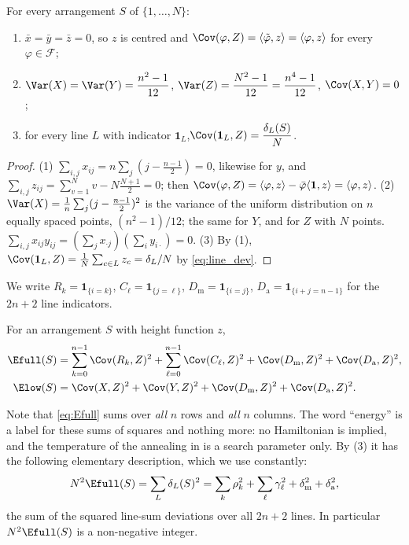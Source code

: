 \begin{lemma}
\label{lem:variances}
For every arrangement $S$ of $\{1,\dots,N\}$:
\begin{enumerate}
\item $\bar x=\bar y=\bar z=0$, so $z$ is centred and $\Cov(\varphi,Z)=\langle\tilde\varphi,z\rangle=\langle\varphi,z\rangle$ for every $\varphi\in\mathcal F$;
\item $\Var(X)=\Var(Y)=\dfrac{n^{2}-1}{12}$, \quad $\Var(Z)=\dfrac{N^{2}-1}{12}=\dfrac{n^{4}-1}{12}$, \quad $\Cov(X,Y)=0$;
\item for every line $L$ with indicator $\mathbf 1_L$,\quad $\Cov(\mathbf 1_L,Z)=\dfrac{\delta_L(S)}{N}$.
\end{enumerate}
\end{lemma}

\begin{proof}
(1) $\sum_{i,j}x_{ij}=n\sum_{j}(j-\frac{n-1}2)=0$, likewise for $y$, and $\sum_{i,j}z_{ij}=\sum_{v=1}^{N}v-N\frac{N+1}2=0$;
then $\Cov(\varphi,Z)=\langle\varphi,z\rangle-\bar\varphi\langle\mathbf 1,z\rangle=\langle\varphi,z\rangle$.
(2) $\Var(X)=\frac1n\sum_{j}(j-\frac{n-1}2)^{2}$ is the variance of the uniform distribution on $n$ equally spaced
points, $(n^{2}-1)/12$; the same for $Y$, and for $Z$ with $N$ points.  $\sum_{i,j}x_{ij}y_{ij}=(\sum_jx_{\cdot j})(\sum_iy_{i\cdot})=0$.
(3) By (1), $\Cov(\mathbf 1_L,Z)=\frac1N\sum_{c\in L}z_c=\delta_L/N$ by \eqref{eq:line_dev}.
\end{proof}

We write $R_k=\mathbf 1_{\{i=k\}}$, $C_\ell=\mathbf 1_{\{j=\ell\}}$,
$D_{\mathrm{m}}=\mathbf 1_{\{i=j\}}$, $D_{\mathrm{a}}=\mathbf 1_{\{i+j=n-1\}}$ for the $2n+2$ line indicators.

\begin{definition}
\label{def:energies}
For an arrangement $S$ with height function $z$,
\begin{align}
\Efull(S)&=\sum_{k=0}^{n-1}\Cov(R_k,Z)^{2}+\sum_{\ell=0}^{n-1}\Cov(C_\ell,Z)^{2}
+\Cov(D_{\mathrm m},Z)^{2}+\Cov(D_{\mathrm a},Z)^{2},\label{eq:Efull}\\
\Elow(S)&=\Cov(X,Z)^{2}+\Cov(Y,Z)^{2}+\Cov(D_{\mathrm m},Z)^{2}+\Cov(D_{\mathrm a},Z)^{2}.\label{eq:Elow}
\end{align}
\end{definition}

Note that \eqref{eq:Efull} sums over \emph{all} $n$ rows and \emph{all} $n$ columns.
The word ``energy'' is a label for these sums of squares and nothing more: no Hamiltonian is implied, and the temperature of the annealing in  is a search parameter only.
By (3) it has the following elementary description, which we use constantly:
\begin{equation}
N^{2}\Efull(S)=\sum_{L}\delta_L(S)^{2}
=\sum_k\rho_k^{2}+\sum_\ell\gamma_\ell^{2}+\delta_{\mathrm m}^{2}+\delta_{\mathrm a}^{2},
\label{eq:Efull_devs}
\end{equation}
the sum of the squared line-sum deviations over all $2n+2$ lines.  In particular $N^{2}\Efull(S)$ is a
non-negative integer.

